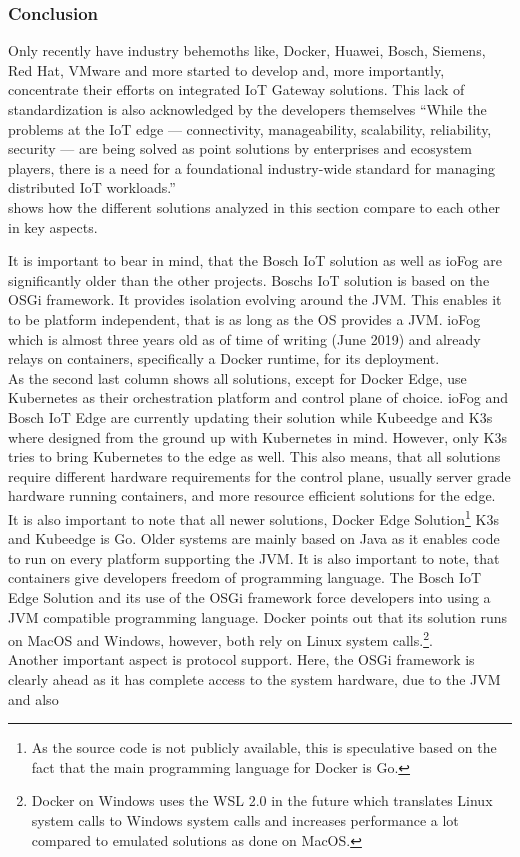 \subsubsection{Conclusion}
Only recently have industry behemoths like, Docker, Huawei, Bosch, Siemens, Red Hat, VMware and more\cite{K8sattheEdgeContectOnWorkingGroup:online} started to develop and, more importantly, concentrate their efforts on integrated IoT Gateway solutions. This lack of standardization is also acknowledged by the developers themselves ``While the problems at the IoT edge — connectivity, manageability, scalability, reliability, security — are being solved as point solutions by enterprises and ecosystem players, there is a need for a foundational industry-wide standard for managing distributed IoT workloads.''\cite{ioFogK8sBlog:online}\\
 shows how the different solutions analyzed in this section compare to each other in key aspects.

It is important to bear in mind, that the Bosch IoT solution as well as ioFog are significantly older than the other projects. Boschs IoT solution is based on the OSGi framework. It provides isolation evolving around the JVM. This enables it to be platform independent, that is as long as the OS provides a JVM. ioFog which is almost three years old as of time of writing (June 2019) and already relays on containers, specifically a Docker runtime, for its deployment.\\
As the second last column shows all solutions, except for Docker Edge, use Kubernetes as their orchestration platform and control plane of choice. ioFog and Bosch IoT Edge are currently updating their solution while Kubeedge and K3s where designed from the ground up with Kubernetes in mind. However, only K3s tries to bring Kubernetes to the edge as well. This also means, that all solutions require different hardware requirements for the control plane, usually server grade hardware running containers, and more resource efficient solutions for the edge. \\
It is also important to note that all newer solutions, Docker Edge Solution\footnote{As the source code is not publicly available, this is speculative based on the fact that the main programming language for Docker is Go.} K3s and Kubeedge is Go. Older systems are mainly based on Java as it enables code to run on every platform supporting the JVM. It is also important to note, that containers give developers freedom of programming language. The Bosch IoT Edge Solution and its use of the OSGi framework force developers into using a JVM compatible programming language. Docker points out that its solution runs on MacOS and Windows, however, both rely on Linux system calls.\footnote{Docker on Windows uses the WSL 2.0 in the future which translates Linux system calls to Windows system calls and increases performance a lot compared to emulated solutions as done on MacOS.}.\\
Another important aspect is protocol support. Here, the OSGi framework is clearly ahead as it has complete access to the system hardware, due to the JVM and also 



